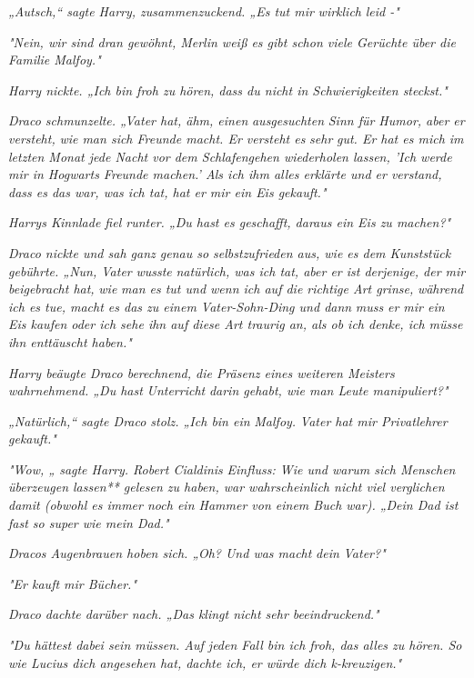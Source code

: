 {\emph{„Autsch,“ sagte Harry, zusammenzuckend. „Es tut mir} \emph{\emph{wirklich}} \emph{leid -"}

\emph{"Nein, wir sind dran gewöhnt, Merlin weiß es gibt schon viele Gerüchte über die Familie Malfoy."}

\emph{Harry nickte. „Ich bin froh zu hören, dass du nicht in Schwierigkeiten steckst."}

\emph{Draco schmunzelte. „Vater hat, ähm, einen} \emph{\emph{ausgesuchten}} \emph{Sinn für Humor, aber er} \emph{\emph{versteht,}} \emph{wie man sich Freunde macht. Er versteht es} \emph{\emph{sehr}} \emph{gut. Er hat es mich im letzten Monat jede Nacht vor dem Schlafengehen wiederholen lassen, 'Ich werde mir in Hogwarts Freunde machen.' Als ich ihm alles erklärte und er verstand, dass es das war, was ich tat, hat er mir ein Eis gekauft."}

\emph{Harrys Kinnlade fiel runter. „\emph{Du hast es geschafft, daraus ein Eis zu machen?}"}

\emph{Draco nickte und sah ganz genau so selbstzufrieden aus, wie es dem Kunststück gebührte. „Nun, Vater} \emph{\emph{wusste}} \emph{natürlich, was ich tat, aber er ist derjenige, der mir beigebracht hat,} \emph{\emph{wie}} \emph{man es tut und wenn ich auf die richtige Art grinse,} \emph{\emph{während}} \emph{ich es tue, macht es das zu einem Vater-Sohn-Ding und dann} \emph{\emph{muss}} \emph{er mir ein Eis kaufen oder ich sehe ihn auf diese Art traurig an, als ob ich denke, ich müsse ihn enttäuscht haben."}

\emph{Harry beäugte Draco berechnend, die Präsenz eines weiteren Meisters wahrnehmend. „Du hast} \emph{\emph{Unterricht}} \emph{darin gehabt, wie man Leute manipuliert?"}

\emph{„Natürlich,“ sagte Draco stolz. „Ich bin ein} \emph{\emph{Malfoy.}} \emph{Vater hat mir Privatlehrer gekauft."}

\emph{"Wow, „ sagte Harry. Robert Cialdinis} \emph{\emph{Einfluss: Wie und warum sich Menschen überzeugen lassen}** gelesen zu haben, war wahrscheinlich nicht viel verglichen damit (obwohl es immer noch ein Hammer von einem Buch war). „Dein Dad ist fast so super wie mein Dad."}

\emph{Dracos Augenbrauen hoben sich. „Oh? Und was macht} \emph{\emph{dein}} \emph{Vater?"}

\emph{"Er kauft mir Bücher."}

\emph{Draco dachte darüber nach. „Das klingt nicht sehr beeindruckend."}

\emph{"Du hättest dabei sein müssen. Auf jeden Fall bin ich froh, das alles zu hören. So wie Lucius dich angesehen hat, dachte ich, er würde dich k-kreuzigen."}

}
